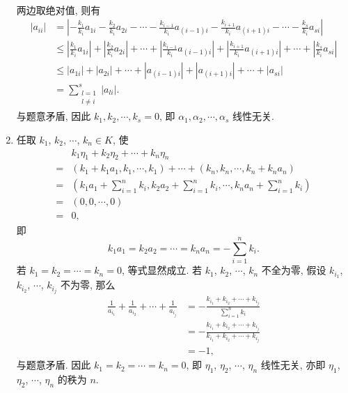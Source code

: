 \begin{enumerate}
\begin{align*}
        \end{align*}
        两边取绝对值, 则有
        \begin{align*}
            |a_{ii}| &= |-\frac{k_1}{k_i}a_{1i} - \frac{k_2}{k_i}a_{2i} - \cdots - \frac{k_{i-1}}{k_i}a_{(i-1)i} - \frac{k_{i+1}}{k_i}a_{(i+1)i} - \cdots - \frac{k_s}{k_i}a_{si}| \\
                        &\leqslant |\frac{k_1}{k_i}a_{1i}| + |\frac{k_2}{k_i}a_{2i}| + \cdots + |\frac{k_{i-1}}{k_i}a_{(i-1)i}| + |\frac{k_{i+1}}{k_i}a_{(i+1)i}| + \cdots + |\frac{k_s}{k_i}a_{si}| \\
                        &\leqslant |a_{1i}| + |a_{2i}| + \cdots + |a_{(i-1)i}| + |a_{(i+1)i}| + \cdots + |a_{si}| \\
                        &= \sum_{\substack{l=1\\l \neq i}}^s |a_{li}|.
        \end{align*}
        与题意矛盾, 因此 $k_1, k_2, \cdots, k_s = 0$, 即 $\alpha_1, \alpha_2, \cdots, \alpha_s$ 线性无关.
    \item %
        任取 $k_1$, $k_2$, $\cdots$, $k_n \in K$, 使
        \begin{align*}
            & k_1\eta_1 + k_2\eta_2 + \cdots + k_n\eta_n \\
            ={} & (k_1 + k_1a_1, k_1, \cdots, k_1) + \cdots + (k_n, k_n, \cdots, k_n + k_na_n) \\
            ={} & \left(k_1a_1 + \sum_{i=1}^nk_i, k_2a_2 + \sum_{i=1}^nk_i, \cdots, k_na_n + \sum_{i=1}^nk_i\right) \\
            ={} & (0, 0, \cdots, 0) \\
            ={} & 0,
        \end{align*}
        即
        \[
            k_1a_1 = k_2a_2 = \cdots = k_na_n = -\sum_{i=1}^nk_i.    
        \]
        若 $k_1 = k_2 = \cdots = k_n = 0$, 等式显然成立. 若 $k_1$, $k_2$, $\cdots$, $k_n$ 不全为零, 假设 $k_{i_1}$, $k_{i_2}$, $\cdots$, $k_{i_j}$ 不为零, 那么
        \begin{align*}
            \frac{1}{a_{i_1}} + \frac{1}{a_{i_2}} + \cdots + \frac{1}{a_{i_j}} &= -\frac{k_{i_1} + k_{i_2} + \cdots + k_{i_j}}{\displaystyle{\sum_{i=1}^nk_i}} \\
                                                                                &= -\frac{k_{i_1} + k_{i_2} + \cdots + k_{i_j}}{k_{i_1} + k_{i_2} + \cdots + k_{i_j}} \\
                                                                                &= -1,
        \end{align*}
        与题意矛盾. 因此 $k_1 = k_2 = \cdots = k_n = 0$, 即 $\eta_1$, $\eta_2$, $\cdots$, $\eta_n$ 线性无关, 亦即 $\eta_1$, $\eta_2$, $\cdots$, $\eta_n$ 的秩为 $n$.
\end{enumerate}
% 
